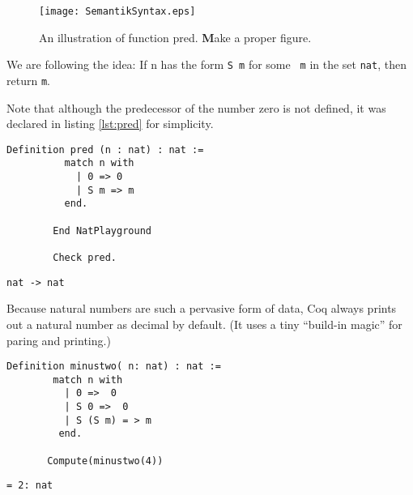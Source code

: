 	   \begin{figure}[p]
	   	\texttt{[image: SemantikSyntax.eps]}
	   	\caption{An illustration of function pred. {\textbf Make a proper figure.}}
	   	\label{fig:SemantikAndSyntaxPred}	     
	   \end{figure}	    

	  We are following the idea:  If n has the form \lstinline!S m! for some \lstinline! m! in the set \lstinline!nat!, then return  \lstinline!m!.
	  \begin{example}%
	   {\normalfont 
	   Note that although the predecessor of the number zero is not defined, it was declared in listing \ref{lst:pred} for simplicity.    

	   
	   \begin{minipage}[t]{0.45\textwidth}
	   \begin{lstlisting}[caption= \lstinline!pred!, label =lst:pred]
	  	Definition pred (n : nat) : nat := 
	  	  match n with 
	   	    | 0 => 0
	   	    | S m => m
	   	  end. 
	   	  
	    End NatPlayground
	   	 
	    Check pred. 
	    \end{lstlisting}
	    \end{minipage}
	    \hfill
	    \begin{minipage}[t]{0.45\textwidth}
	    \begin{lstlisting}[caption= Coq-output]
	     nat -> nat    
	    \end{lstlisting}
	    \end{minipage}
	   
	    
	  \normalfont }
	  \end{example}
	  
	  Because natural numbers are such a pervasive form of data, Coq always prints out a natural number as decimal by default.
	  (It uses a tiny ``build-in magic'' for paring and printing.)
	 
	  \begin{minipage}[t]{0.50\textwidth}
	  \begin{lstlisting}[caption= \lstinline! minustwo!]
	   Definition minustwo( n: nat) : nat :=
	    match n with
	      | 0 =>  0
	      | S 0 =>  0
	      | S (S m) = > m
	     end.
	     
	   Compute(minustwo(4))
	   \end{lstlisting} 
	   \end{minipage} 
	   \hfill     
	  \begin{minipage}[t]{0.45\textwidth}
	  \begin{lstlisting}[caption = Coq-output] 
	    = 2: nat 
	   \end{lstlisting}
	   \end{minipage}     
	      
